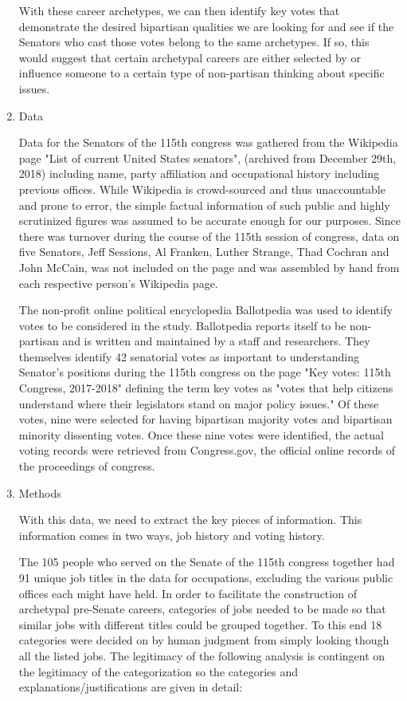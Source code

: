 \documentclass[11pt]{article}
\begin{document}
\begin{enumerate}
With these career archetypes, we can then identify key votes that demonstrate the desired bipartisan qualities we are looking for and see if the Senators who cast those votes belong to the same archetypes. If so, this would suggest that certain archetypal careers are either selected by or influence someone to a certain type of non-partisan thinking about specific issues.
	\item Data
	
	Data for the Senators of the 115th congress was gathered from the Wikipedia page "List of current United States senators", (archived from December 29th, 2018) including name, party affiliation and occupational history including previous offices. While Wikipedia is crowd-sourced and thus unaccountable and prone to error, the simple factual information of such public and highly scrutinized figures was assumed to be accurate enough for our purposes. Since there was turnover during the course of the 115th session of congress, data on five Senators, Jeff Sessions, Al Franken, Luther Strange, Thad Cochran and John McCain, was not included on the page and was assembled by hand from each respective person's Wikipedia page.
	
The non-profit online political encyclopedia Ballotpedia was used to identify votes to be considered in the study. Ballotpedia reports itself to be non-partisan and is written and maintained by a staff and researchers. They themselves identify 42 senatorial votes as important to understanding Senator's positions during the 115th congress on the page "Key votes: 115th Congress, 2017-2018" defining the term key votes as "votes that help citizens understand where their legislators stand on major policy issues." Of these votes, nine were selected for having bipartisan majority votes and bipartisan minority dissenting votes. Once these nine votes were identified, the actual voting records were retrieved from Congress.gov, the official online records of the proceedings of congress.
	\item Methods
	
	With this data, we need to extract the key pieces of information. This information comes in two ways, job history and voting history.

The 105 people who served on the Senate of the 115th congress together had 91 unique job titles in the data for occupations, excluding the various public offices each might have held. In order to facilitate the construction of archetypal pre-Senate careers, categories of jobs needed to be made so that similar jobs with different titles could be grouped together. To this end 18 categories were decided on by human judgment from simply looking though all the listed jobs. The legitimacy of the following analysis is contingent on the legitimacy of the categorization so the categories and explanations/justifications are given in detail:


\end{enumerate}
\end{document}
